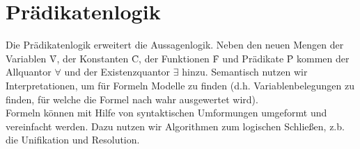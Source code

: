\newcommand{\INT}{\mathcal{I}}
\newcommand{\ZUW}{\mathcal{Z}}
\newcommand{\FM}{\mathcal{T}}
\newcommand{\HU}{\Delta_{F}}


\section{Prädikatenlogik}
Die Prädikatenlogik erweitert die Aussagenlogik. Neben den neuen Mengen der Variablen \f{V}, der Konstanten \f{C}, der Funktionen \f{F} und Prädikate \f{P} kommen der Allquantor $\forall$ und der Existenzquantor $\exists$ hinzu. Semantisch nutzen wir Interpretationen, um für Formeln Modelle zu finden (d.h. Variablenbelegungen zu finden, für welche die Formel nach wahr ausgewertet wird). \\
Formeln können mit Hilfe von syntaktischen Umformungen umgeformt und vereinfacht werden. Dazu nutzen wir Algorithmen zum logischen Schließen, z.b. die Unifikation und Resolution. 

